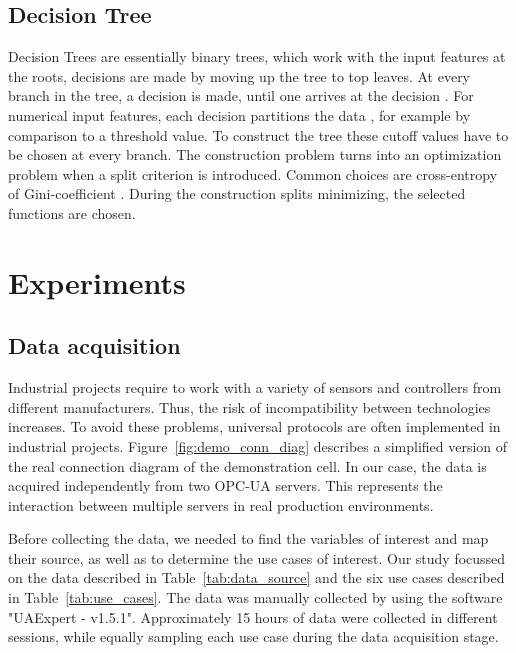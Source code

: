 \documentclass[5p,times,procedia]{elsarticle}
\begin{document}
\subsection{Decision Tree}
Decision Trees are essentially binary trees, which work with the input
features at the roots, decisions are made by moving
up the tree to top leaves. At every branch in the tree, a decision
is made, until one arrives at the decision \cite{Marsland2015Machine}.
For numerical input features, each decision partitions the data
\cite{aggarwal2015data}, for example by comparison to a threshold value.
To construct the tree these cutoff values have to be chosen at every branch. The construction problem turns into an optimization problem when a split criterion is introduced. Common choices are cross-entropy of Gini-coefficient \cite{aggarwal2015data}.
During the construction splits minimizing, the selected functions are chosen. 

\section{Experiments} \label{sec:experiment}

\subsection{Data acquisition}

Industrial projects require to work with a variety of sensors and controllers from different manufacturers. Thus, the risk of incompatibility between technologies increases. To avoid these problems, universal protocols are often implemented in industrial projects. Figure~\ref{fig:demo_conn_diag} describes a simplified version of the real connection diagram of the demonstration cell. In our case, the data is acquired independently from two OPC-UA servers. This represents the interaction between multiple servers in real production environments. 

Before collecting the data, we needed to find the variables of interest and map their source, as well as to determine the use cases of interest. Our study focussed on the data described in Table~\ref{tab:data_source} and the six use cases described in Table~\ref{tab:use_cases}. The data was manually collected by using the software "UAExpert - v1.5.1". Approximately 15 hours of data were collected in different sessions, while equally sampling each use case during the data acquisition stage.
\end{document}
